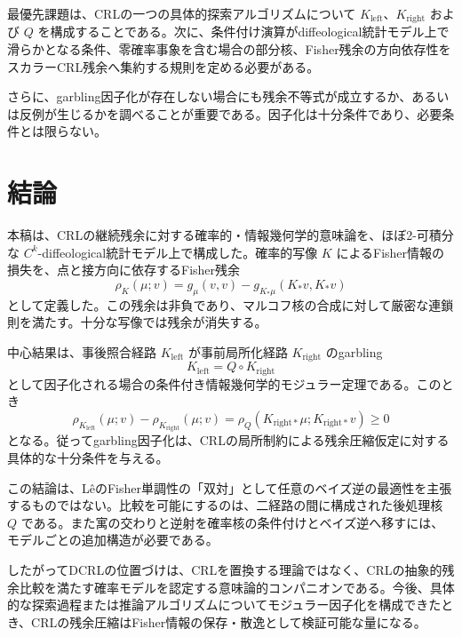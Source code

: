 \documentclass[a4paper,11pt]{ltjsarticle}
\theoremstyle{definition}
\theoremstyle{plain}
\begin{document}
最優先課題は、CRLの一つの具体的探索アルゴリズムについて $K_{\mathrm{left}}$、$K_{\mathrm{right}}$ および $Q$ を構成することである。次に、条件付け演算がdiffeological統計モデル上で滑らかとなる条件、零確率事象を含む場合の部分核、Fisher残余の方向依存性をスカラーCRL残余へ集約する規則を定める必要がある。

さらに、garbling因子化が存在しない場合にも残余不等式が成立するか、あるいは反例が生じるかを調べることが重要である。因子化は十分条件であり、必要条件とは限らない。

\section{結論}

本稿は、CRLの継続残余に対する確率的・情報幾何学的意味論を、ほぼ2-可積分な $C^k$-diffeological統計モデル上で構成した。確率的写像 $K$ によるFisher情報の損失を、点と接方向に依存するFisher残余
\begin{equation*}
 \rho_K(\mu;v)
 =g_\mu(v,v)
 -g_{K_*\mu}(K_*v,K_*v)
\end{equation*}
として定義した。この残余は非負であり、マルコフ核の合成に対して厳密な連鎖則を満たす。十分な写像では残余が消失する。

中心結果は、事後照合経路 $K_{\mathrm{left}}$ が事前局所化経路 $K_{\mathrm{right}}$ のgarbling
\begin{equation*}
 K_{\mathrm{left}}
 =Q\circ K_{\mathrm{right}}
\end{equation*}
として因子化される場合の条件付き情報幾何学的モジュラー定理である。このとき
\begin{equation*}
 \rho_{K_{\mathrm{left}}}(\mu;v)
 -\rho_{K_{\mathrm{right}}}(\mu;v)
 =
 \rho_Q(K_{\mathrm{right}*}\mu;
        K_{\mathrm{right}*}v)
 \geq0
\end{equation*}
となる。従ってgarbling因子化は、CRLの局所制約による残余圧縮仮定に対する具体的な十分条件を与える。

この結論は、LêのFisher単調性の「双対」として任意のベイズ逆の最適性を主張するものではない。比較を可能にするのは、二経路の間に構成された後処理核 $Q$ である。また寓の交わりと逆射を確率核の条件付けとベイズ逆へ移すには、モデルごとの追加構造が必要である。

したがってDCRLの位置づけは、CRLを置換する理論ではなく、CRLの抽象的残余比較を満たす確率モデルを認定する意味論的コンパニオンである。今後、具体的な探索過程または推論アルゴリズムについてモジュラー因子化を構成できたとき、CRLの残余圧縮はFisher情報の保存・散逸として検証可能な量になる。



\end{document}
